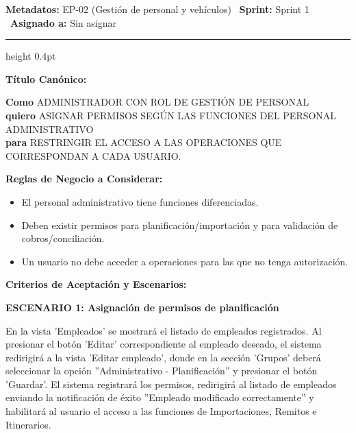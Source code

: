 \documentclass[a4paper,9pt]{article}
\begin{document}
\begin{tcolorbox}[hucard, title={\textbf{HU-8: ASIGNAR PERMISOS ADMINISTRATIVOS} \hfill \scriptsize \colorbox{bluestatus}{\textbf{\ New\ }} \quad \colorbox{white}{\textcolor{primarydark}{\textbf{\ 3 pts\ }}}}]
\vspace{-1pt}
\noindent\textbf{\footnotesize Metadatos:} EP-02 (Gestión de personal y vehículos) \textbar\ \textbf{Sprint:} Sprint 1 \textbar\ \textbf{Asignado a:} Sin asignar\par\vspace{2pt}
\hrule height 0.4pt\par\vspace{3pt}
\noindent\textbf{\footnotesize Título Canónico:}\par\vspace{1pt}
{\small \textbf{Como} ADMINISTRADOR CON ROL DE GESTIÓN DE PERSONAL \\ \textbf{quiero} ASIGNAR PERMISOS SEGÚN LAS FUNCIONES DEL PERSONAL ADMINISTRATIVO \\ \textbf{para} RESTRINGIR EL ACCESO A LAS OPERACIONES QUE CORRESPONDAN A CADA USUARIO.}\par\vspace{3pt}
\noindent\textbf{\footnotesize Reglas de Negocio a Considerar:}\par\vspace{1pt}
{\footnotesize
\begin{itemize}[leftmargin=12pt, nosep, itemsep=1.5pt, topsep=1pt]
\item El personal administrativo tiene funciones diferenciadas.
\item Deben existir permisos para planificación/importación y para validación de cobros/conciliación.
\item Un usuario no debe acceder a operaciones para las que no tenga autorización.
\end{itemize}
}\par\vspace{3pt}
\noindent\textbf{\footnotesize Criterios de Aceptación y Escenarios:}\par\vspace{2pt}
{\footnotesize
\noindent\textbf{\textcolor{secondarydark}{ESCENARIO 1:  Asignación de permisos de planificación}}\par\vspace{1pt}
En la vista 'Empleados' se mostrará el listado de empleados registrados. Al presionar el botón 'Editar' correspondiente al empleado deseado, el sistema redirigirá a la vista 'Editar empleado', donde en la sección 'Grupos' deberá seleccionar la opción ''Administrativo - Planificación'' y presionar el botón 'Guardar'. El sistema registrará los permisos, redirigirá al listado de empleados enviando la notificación de éxito ''Empleado modificado correctamente'' y habilitará al usuario el acceso a las funciones de Importaciones, Remitos e Itinerarios.\par\vspace{2.5pt}
}
\end{tcolorbox}
\end{document}
